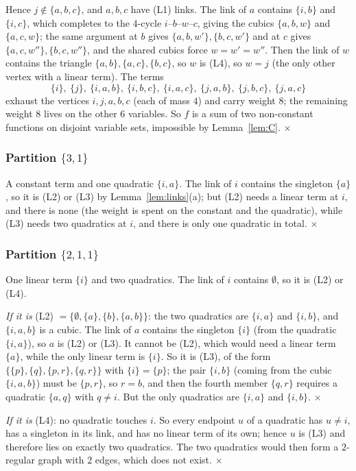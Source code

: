 \documentclass[11pt,reqno]{amsart}
\theoremstyle{plain}
\theoremstyle{definition}
\numberwithin{theorem}{section}
\begin{document}
Hence $j \notin \{a,b,c\}$, and $a, b, c$ have (L1) links. The link of $a$ contains
$\{i,b\}$ and $\{i,c\}$, which completes to the $4$-cycle $i$--$b$--$w$--$c$, giving the cubics
$\{a,b,w\}$ and $\{a,c,w\}$; the same argument at $b$ gives $\{a,b,w'\}, \{b,c,w'\}$ and at $c$
gives $\{a,c,w''\}, \{b,c,w''\}$, and the shared cubics force $w = w' = w''$. Then the link of
$w$ contains the triangle $\{a,b\},\{a,c\},\{b,c\}$, so $w$ is (L4), so $w = j$ (the only other
vertex with a linear term). The terms
\[
  \{i\},\ \{j\},\ \{i,a,b\},\ \{i,b,c\},\ \{i,a,c\},\ \{j,a,b\},\ \{j,b,c\},\ \{j,a,c\}
\]
exhaust the vertices $i, j, a, b, c$ (each of mass $4$) and carry weight $8$; the remaining
weight $8$ lives on the other $6$ variables. So $f$ is a sum of two non-constant functions on
disjoint variable sets, impossible by Lemma~\ref{lem:C}. \hfill$\times$

\subsubsection*{Partition $\{3,1\}$} A constant term and one quadratic $\{i,a\}$. The link of
$i$ contains the singleton $\{a\}$, so it is (L2) or (L3) by
Lemma~\ref{lem:links}(a); but (L2) needs a linear term at $i$, and there is none (the weight is
spent on the constant and the quadratic), while (L3) needs two quadratics at $i$, and there is
only one quadratic in total. \hfill$\times$

\subsubsection*{Partition $\{2,1,1\}$} One linear term $\{i\}$ and two quadratics. The link of
$i$ contains $\emptyset$, so it is (L2) or (L4).

\emph{If it is} (L2) $= \{\emptyset, \{a\},\{b\},\{a,b\}\}$: the two quadratics are $\{i,a\}$
and $\{i,b\}$, and $\{i,a,b\}$ is a cubic. The link of $a$ contains the singleton $\{i\}$ (from
the quadratic $\{i,a\}$), so $a$ is (L2) or (L3). It cannot be (L2), which would need a linear
term $\{a\}$, while the only linear term is $\{i\}$. So it is (L3), of the form
$\{\{p\},\{q\},\{p,r\},\{q,r\}\}$ with $\{i\} = \{p\}$; the pair $\{i,b\}$ (coming from the cubic
$\{i,a,b\}$) must be $\{p,r\}$, so $r = b$, and then the fourth member $\{q,r\}$ requires a
quadratic $\{a,q\}$ with $q \ne i$. But the only quadratics are $\{i,a\}$ and $\{i,b\}$.
\hfill$\times$

\emph{If it is} (L4): no quadratic touches $i$. So every endpoint $u$ of a quadratic has
$u \ne i$, has a singleton in its link, and has no linear term of its own; hence $u$ is (L3) and
therefore lies on exactly two quadratics. The two quadratics would then form a $2$-regular
graph with $2$ edges, which does not exist. \hfill$\times$
\end{document}
